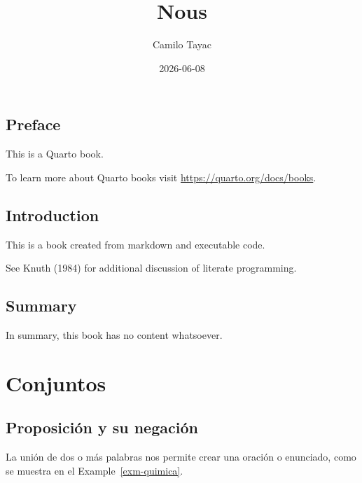 \documentclass[
  letterpaper,
]{scrbook}
\title{Nous}
\author{Camilo Tayac}
\date{2026-06-08}
\renewcommand*\contentsname{Table of contents}
\newcommand\contentsname{Table of contents}
\theoremstyle{definition}
\theoremstyle{remark}
\begin{document}
\frontmatter
\maketitle

\renewcommand*\contentsname{Table of contents}
{
\setcounter{tocdepth}{2}
\tableofcontents
}

\mainmatter
{}

\chapter*{Preface}\label{preface}


This is a Quarto book.

To learn more about Quarto books visit
\url{https://quarto.org/docs/books}.


\chapter*{Introduction}\label{introduction}


This is a book created from markdown and executable code.

See Knuth (1984) for additional discussion of literate programming.


\chapter*{Summary}\label{summary}


In summary, this book has no content whatsoever.

\part{Conjuntos}

\chapter{Proposición y su negación}\label{sec-proposicion}

La unión de dos o más palabras nos permite crear una oración o
enunciado, como se muestra en el Example~\ref{exm-quimica}.
\end{document}
